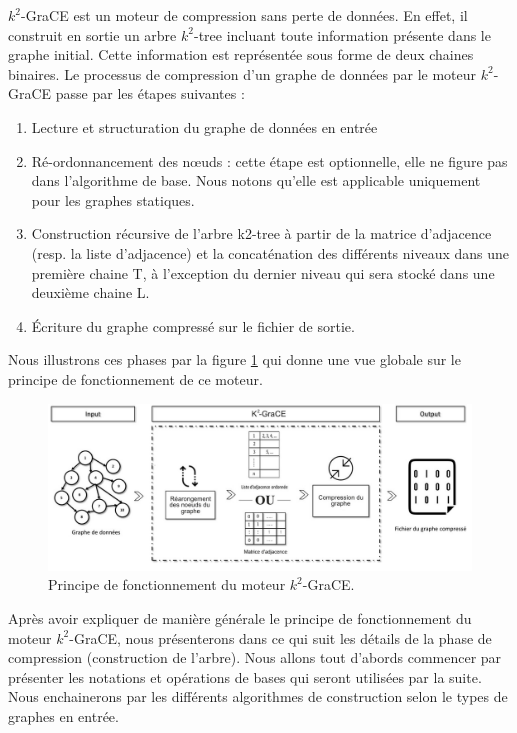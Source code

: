 \documentclass[a4paper,oneside,12pt]{report}
\theoremstyle{definition}
\begin{document}
	
$k^2$-GraCE est un moteur de compression sans perte de données. En effet, il construit en sortie un arbre $k^2$-tree incluant toute information présente dans le graphe initial. Cette information est représentée sous forme de deux chaines binaires. Le processus de compression d'un graphe de données par le moteur $k^2$-GraCE passe par les étapes suivantes :
\begin{enumerate}
\item Lecture et structuration du graphe de données en entrée 
\item Ré-ordonnancement des nœuds : cette étape est optionnelle, elle ne figure pas dans l'algorithme de base. Nous notons qu'elle est applicable uniquement pour les graphes statiques. 
\item Construction récursive de l'arbre k2-tree à partir de la matrice d'adjacence (resp. la liste d'adjacence) et la concaténation des différents niveaux dans une première chaine T, à l'exception du dernier niveau qui sera stocké dans une deuxième chaine L.

\item Écriture du graphe compressé sur le fichier de sortie.
\end{enumerate}

Nous illustrons ces phases par la figure \ref{k2grace} qui donne une vue globale sur le principe de fonctionnement de ce moteur.


\begin{figure}[H]
\includegraphics[scale=0.48]{./ressources/image/ograce.jpg}
\caption[Principe de fonctionnement du moteur $k^2$-GraCE]{Principe de fonctionnement du moteur $k^2$-GraCE.}
			\label{k2grace}
\end{figure}
Après avoir expliquer de manière générale le principe de fonctionnement du moteur $k^2$-GraCE, nous présenterons dans ce qui suit les détails de la phase de compression (construction de l'arbre). Nous allons tout d'abords commencer par présenter les notations et opérations de bases qui seront utilisées par la suite. Nous enchainerons par les différents algorithmes de construction selon le types de graphes en entrée.
		
\end{document}
